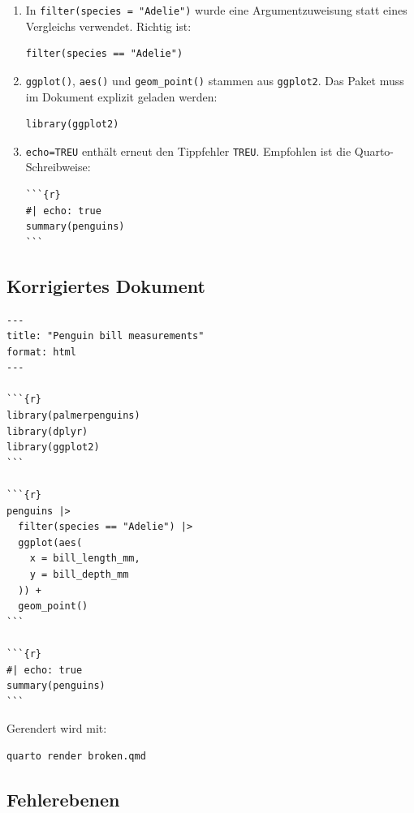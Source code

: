 \documentclass[11pt,a4paper]{ctexart}
\begin{document}
\begin{enumerate}
  \item In \lstinline|filter(species = "Adelie")| wurde eine Argumentzuweisung
  statt eines Vergleichs verwendet. Richtig ist:

\begin{lstlisting}[style=rcode]
filter(species == "Adelie")
\end{lstlisting}

  \item \lstinline|ggplot()|, \lstinline|aes()| und
  \lstinline|geom_point()| stammen aus \texttt{ggplot2}. Das Paket muss im
  Dokument explizit geladen werden:

\begin{lstlisting}[style=rcode]
library(ggplot2)
\end{lstlisting}

  \item \lstinline|echo=TREU| enthält erneut den Tippfehler
  \lstinline|TREU|. Empfohlen ist die Quarto-Schreibweise:

\begin{lstlisting}[style=textcode]
```{r}
#| echo: true
summary(penguins)
```
\end{lstlisting}
\end{enumerate}

\subsection{Korrigiertes Dokument}

\begin{lstlisting}[style=textcode]
---
title: "Penguin bill measurements"
format: html
---

```{r}
library(palmerpenguins)
library(dplyr)
library(ggplot2)
```

```{r}
penguins |>
  filter(species == "Adelie") |>
  ggplot(aes(
    x = bill_length_mm,
    y = bill_depth_mm
  )) +
  geom_point()
```

```{r}
#| echo: true
summary(penguins)
```
\end{lstlisting}

Gerendert wird mit:

\begin{lstlisting}[style=textcode]
quarto render broken.qmd
\end{lstlisting}

\subsection{Fehlerebenen}
\end{document}
